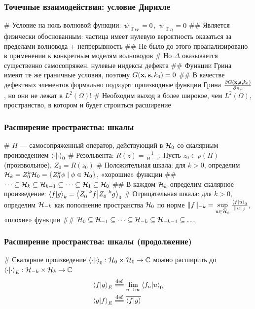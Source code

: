 \documentclass{beamer}
\begin{document}
\begin{frame}[fragile]
\frametitle{Точечные взаимодействия: условие Дирихле}
\begin{easylist}[itemize]
# Условие на ноль волновой функции: $\eval{\psi}_{\Gamma_W} = 0$, $\eval{\psi}_{\Gamma_R} = 0$
## Является физически обоснованным: частица имеет нулевую вероятность оказаться за пределами волновода + непрерывность
## Не было до этого проанализировано в применении к конкретным моделям волноводов
# Но $\Delta$ оказывается существенно самосопряжен, нулевые индексы дефекта
## Функции Грина имеют те же граничные условия, поэтому $G(\vb{x}, \vb{s}, k_0) = 0$
## В качестве дефектных элементов формально подходят производные функции Грина $\pdv{G(\vb{x}, \vb{s}, k_0)}{n_s}$, но они не лежат в $L^2(\Omega)$!
# Необходим выход в более широкое, чем $L^2(\Omega)$, пространство, в котором и будет строиться расширение
\end{easylist}
\end{frame}

\begin{frame}[fragile]
\frametitle{Расширение пространства: шкалы}
\begin{easylist}[itemize]
# $H$ — самосопряженный оператор, действующий в $\mathcal{H}_{0}$ со скалярным произведением $\ip{\cdot}{\cdot}_0$
# Резольвента: $R(z) = \frac{1}{H - z}$. Пусть $z_0 \in \rho(H)$ (произвольное), $Z_0 = R(z_0)$
# Положительная шкала: для $k > 0$, определим $\mathcal{H}_{k} = Z_0^k \mathcal{H}_{0} = \{ Z_0^k \phi \mid \phi \in \mathcal{H}_{0} \}$, «хорошие» функции
## $\dots \subseteq \mathcal{H}_{k} \subseteq \mathcal{H}_{k - 1} \subseteq \dots \subseteq \mathcal{H}_{1} \subseteq \mathcal{H}_{0}$
## В каждом $\mathcal{H}_{k}$ определим скалярное произведение: $\ip{f}{g}_k = \ip{Z_0^{-k} f}{Z_0^{-k} g}_0$
# Отрицательная шкала: для $k > 0$, определим $\mathcal{H}_{-k}$ как пополнение пространства $\mathcal{H}_{0}$ по норме $\|f \|_{-k} = \sup\limits_{u \in \hilb{k}} \frac{\ip{f}{u}_0}{\|u\|_j}$, «плохие» функции
## $\mathcal{H}_{0} \subseteq \mathcal{H}_{-1} \subseteq \dots \subseteq \mathcal{H}_{-k} \subseteq \mathcal{H}_{-k - 1} \subseteq \dots $
\end{easylist}
\end{frame}

\begin{frame}[fragile]
\frametitle{Расширение пространства: шкалы (продолжение)}
\begin{easylist}[itemize]
# Скалярное произведение $\ip{\cdot}{\cdot}_0: \hilb{0} \times \hilb{0} \to \bbC$ можно расширить до $\ip{\cdot}{\cdot}_E: \hilb{-k} \times \hilb{k} \to \bbC$
\begin{align*}
\ip{f}{g}_E &\eqdef \lim\limits_{n \to \infty} \ip{f_n}{u}_0 \\
\ip{g}{f}_E &\eqdef \cconj{\ip{f}{g}}
\end{align*}
\end{easylist}
\end{frame}
\end{document}
